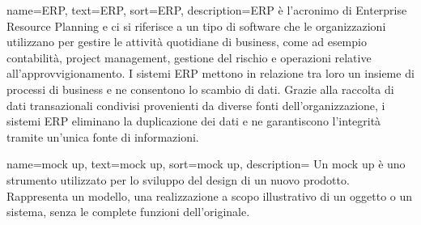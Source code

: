 {
    name={ERP},
    text=ERP,
    sort=ERP,
    description={ERP è l'acronimo di Enterprise Resource Planning e ci si riferisce a un tipo di software che le organizzazioni utilizzano per gestire le attività quotidiane di business, come ad esempio contabilità, project management, gestione del rischio e operazioni relative all'approvvigionamento. 
I sistemi ERP mettono in relazione tra loro un insieme di processi di business e ne consentono lo scambio di dati. Grazie alla raccolta di dati transazionali condivisi provenienti da diverse fonti dell'organizzazione, i sistemi ERP eliminano la duplicazione dei dati e ne garantiscono l'integrità tramite un'unica fonte di informazioni.}
}


{
    name={mock up},
    text=mock up,
    sort=mock up,
    description={ Un mock up è uno strumento utilizzato per lo sviluppo del design di un nuovo prodotto. Rappresenta  un modello, una realizzazione a scopo illustrativo di un oggetto o un sistema, senza le complete funzioni dell'originale.}
}


